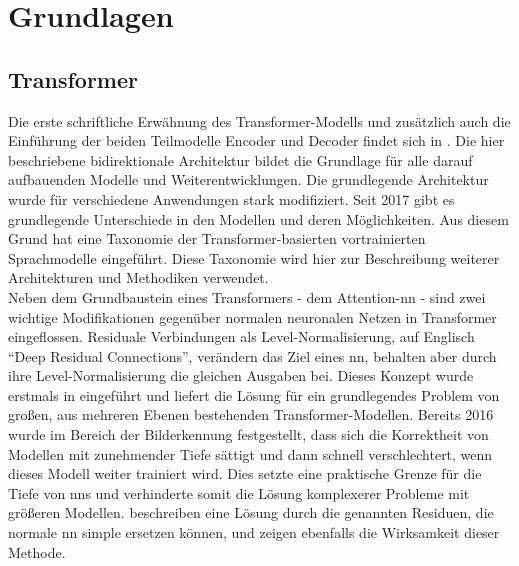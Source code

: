 \chapter{Grundlagen}\label{ch:preliminaries}
\section{Transformer}\label{sec:transformer}
%
Die erste schriftliche Erwähnung des Transformer-Modells und zusätzlich auch die Einführung der beiden Teilmodelle Encoder und Decoder findet sich in \citet{attention}.
Die hier beschriebene bidirektionale Architektur bildet die Grundlage für alle darauf aufbauenden Modelle und Weiterentwicklungen. 
Die grundlegende Architektur wurde für verschiedene Anwendungen stark modifiziert. 
Seit 2017 gibt es grundlegende Unterschiede in den Modellen und deren Möglichkeiten. 
Aus diesem Grund hat \citet{ammus} eine Taxonomie der Transformer-basierten vortrainierten Sprachmodelle eingeführt. 
Diese Taxonomie wird hier zur Beschreibung weiterer Architekturen und Methodiken verwendet.\\

Neben dem Grundbaustein eines Transformers - dem Attention-\ac{nn} - sind zwei wichtige Modifikationen gegenüber normalen neuronalen Netzen in Transformer eingeflossen. 
Residuale Verbindungen als Level-Normalisierung, auf Englisch \enquote{Deep Residual Connections}, verändern das Ziel eines \ac{nn}, behalten aber durch ihre Level-Normalisierung die gleichen Ausgaben bei. 
Dieses Konzept wurde erstmals in \citet{deep_residual} eingeführt und liefert die Lösung für ein grundlegendes Problem von großen, aus mehreren Ebenen bestehenden Transformer-Modellen. 
Bereits 2016 wurde im Bereich der Bilderkennung festgestellt, dass sich die Korrektheit von Modellen mit zunehmender Tiefe sättigt und dann schnell verschlechtert, wenn dieses Modell weiter trainiert wird. 
Dies setzte eine praktische Grenze für die Tiefe von \ac{nn}s und verhinderte somit die Lösung komplexerer Probleme mit größeren Modellen. 
\citet{deep_residual} beschreiben eine Lösung durch die genannten Residuen, die normale \ac{nn} simple ersetzen können, und zeigen ebenfalls die Wirksamkeit dieser Methode.\\

